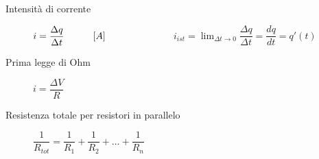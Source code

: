 \documentclass[a4paper,11pt,italian]{article}
\begin{document}
\begin{description}

  \item[Intensità di corrente]
  $ i = \dfrac{\Delta q}{\Delta t} \hspace*{3em} [A]  $~~~~~~~~~~~~~~$ i_{ist} = \displaystyle \lim_{\Delta t \rightarrow 0} \dfrac{\Delta q}{\Delta t} = \dfrac{dq}{dt} = q'(t) $
  
  
  \item[Prima legge di Ohm]
  $ i = \dfrac{\Delta V}{R} $
  
  \item[Resistenza totale per resistori in parallelo] 
  $ \dfrac{1}{R_{tot}} = \dfrac{1}{R_1} + \dfrac{1}{R_2} + \ldots + \dfrac{1}{R_n}  $
%


\end{description}
\end{document}
